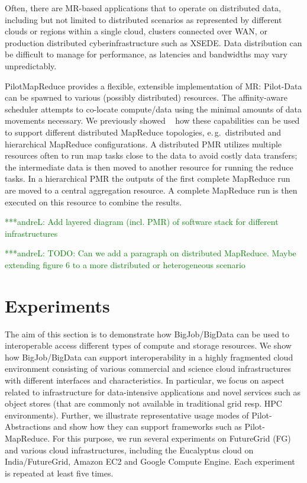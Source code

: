 \documentclass[times]{cpeauth}
\newcommand{\alnote}[1]{ {\textcolor{green} { ***andreL: #1 }}}
\newcommand{\alnote}[1]{}
\newcommand{\pilot}{Pilot\xspace}
\newcommand{\pilotdata}{Pilot-Data\xspace}
\newcommand{\pilotmapreduce}{PilotMapReduce\xspace}
\begin{document}
Often, there are MR-based applications that to operate on distributed
data, including but not limited to distributed scenarios as
represented by different clouds or regions within a single cloud,
clusters connected over WAN, or production distributed
cyberinfrastructure such as XSEDE. Data distribution can be difficult
to manage for performance, as latencies and bandwidths may vary
unpredictably.

\pilotmapreduce provides a flexible, extensible implementation of MR:
\pilotdata can be spawned to various (possibly distributed)
resources. The affinity-aware scheduler attempts to co-locate
compute/data using the minimal amounts of data movements necessary. We
previously showed ~\cite{Mantha:2012:PEF:2287016.2287020} how these
capabilities can be used to support different distributed MapReduce
topologies, e.\,g.\ distributed and hierarchical MapReduce
configurations. A distributed PMR utilizes multiple resources often to
run map tasks close to the data to avoid costly data transfers; the
intermediate data is then moved to another resource for running the
reduce tasks. In a hierarchical PMR the outputs of the first complete
MapReduce run are moved to a central aggregation resource. A complete
MapReduce run is then executed on this resource to combine the
results.
 






\alnote{Add layered diagram (incl. PMR) of software stack for different 
infrastructures}

\alnote{TODO: Can we add a paragraph on distributed MapReduce. Maybe extending 
figure 6 to a more distributed or heterogeneous scenario}


\section{Experiments}

The aim of this section is to demonstrate how BigJob/BigData can be used to
interoperable access different types of compute and storage resources. We show
how BigJob/BigData can support interoperability in a highly fragmented cloud
environment consisting of various commercial and science cloud infrastructures
with different interfaces and characteristics. In particular, we focus on
aspect related to infrastructure for data-intensive applications and novel
services such as object stores (that are commonly not available in traditional
grid resp. HPC environments). Further, we illustrate representative usage
modes of \pilot-Abstractions and show how they can support
frameworks such as Pilot-MapReduce. For this purpose, we run several
experiments on FutureGrid (FG) and various cloud infrastructures, including
the Eucalyptus cloud on India/FutureGrid, Amazon EC2 and Google Compute
Engine. Each experiment is repeated at least five times.
\end{document}
